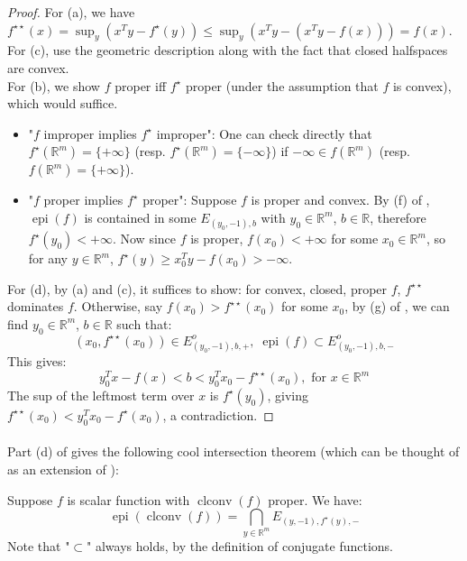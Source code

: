 \begin{proof}
	For (a), we have $f^{\star\star}(x)=\sup_y\left(x^Ty-f^\star(y)\right)\leq \sup_y \left(x^Ty-\left(x^Ty-f(x)\right)\right)=f(x)$.\\
	For (c), use the geometric description along with the fact that closed halfspaces are convex.\\
	For (b), we show $f$ proper iff $f^\star$ proper (under the assumption that $f$ is convex), which would suffice.
	\begin{itemize}
		\item "$f$ improper implies $f^\star$ improper": One can check directly that $f^\star(\mathbb{R}^m)=\{+\infty\}$ (resp. $f^\star(\mathbb{R}^m)=\{-\infty\}$) if $-\infty\in f(\mathbb{R}^m)$ (resp. $f(\mathbb{R}^m)=\{+\infty\}$).
		\item "$f$ proper implies $f^\star$ proper": Suppose $f$ is proper and convex. By (f) of , $\operatorname{epi}(f)$ is contained in some $E_{(y_0,-1),b}$ with $y_0\in \mathbb{R}^{m}$, $b\in \mathbb{R}$, therefore $f^\star(y_0)<+\infty$. Now since $f$ is proper, $f(x_0)<+\infty$ for some $x_0\in \mathbb{R}^m$, so for any $y\in \mathbb{R}^m$, $f^\star(y)\geq x_0^Ty-f(x_0)>-\infty$.
	\end{itemize}
	For (d), by (a) and (c), it suffices to show: for convex, closed, proper $f$, $f^{\star\star}$ dominates $f$. Otherwise, say $f(x_0)>f^{\star\star}(x_0)$ for some $x_0$, by (g) of , we can find $y_0\in \mathbb{R}^m$, $b\in \mathbb{R}$ such that:
	\[
		\left(x_0,f^{\star\star}(x_0)\right)\in E^{o}_{(y_0,-1),b,+}, \; \operatorname{epi}(f)\subset E^o_{(y_0,-1),b,-}
	\]
	This gives:
	\[
		y_0^Tx-f(x)<b<y_0^Tx_0-f^{\star\star}(x_0),\text{ for }x\in \mathbb{R}^m
	\]
	The sup of the leftmost term over $x$ is $f^\star(y_0)$, giving $f^{\star\star}(x_0)<y_0^Tx_0-f^\star(x_0)$, a contradiction.
\end{proof}

\paragraph{}Part (d) of  gives the following cool intersection theorem (which can be thought of as an extension of ):

\begin{coro}\label{coro:025-epigraph-conjugacy-intersection}
	Suppose $f$ is scalar function with $\operatorname{clconv}(f)$ proper. We have:
	\[
		\operatorname{epi}(\operatorname{clconv}(f)) = \bigcap_{y\in \mathbb{R}^m}E_{(y,-1),f^\star(y), -}
	\]
	Note that "$\subset$" always holds, by the definition of conjugate functions.
\end{coro}

